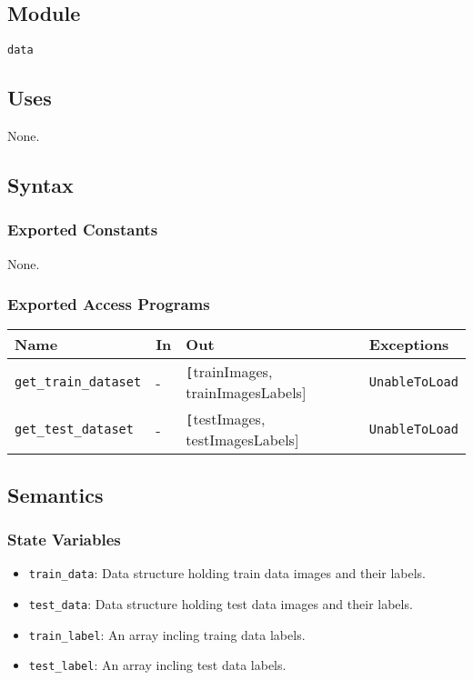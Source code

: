 \documentclass[12pt, titlepage]{article}
\def\code#1{\texttt{#1}}
\begin{document}
\subsection{Module}
\code{data} 

\subsection{Uses}
None.

\subsection{Syntax}
\subsubsection{Exported Constants}
None.

\subsubsection{Exported Access Programs}

\begin{center}
\begin{tabular}{p{3.5cm} p{4cm} p{6cm} p{2cm}}
\hline
\textbf{Name} & \textbf{In} & \textbf{Out} & \textbf{Exceptions} \\
\hline
\code{get\_train\_dataset} & - & \code[trainImages, trainImagesLabels] & \code{UnableToLoad} \\
\code{get\_test\_dataset} & - & \code[testImages, testImagesLabels] & \code{UnableToLoad} \\
\hline
\end{tabular}
\end{center}

\subsection{Semantics}

\subsubsection{State Variables}
\begin{itemize}
  \item \code{train\_data}: Data structure holding train data images and their labels.
  \item \code{test\_data}: Data structure holding test data images and their labels.
  \item \code{train\_label}: An array incling traing data labels.
  \item \code{test\_label}: An array incling test data labels.
\end{itemize}
\end{document}
